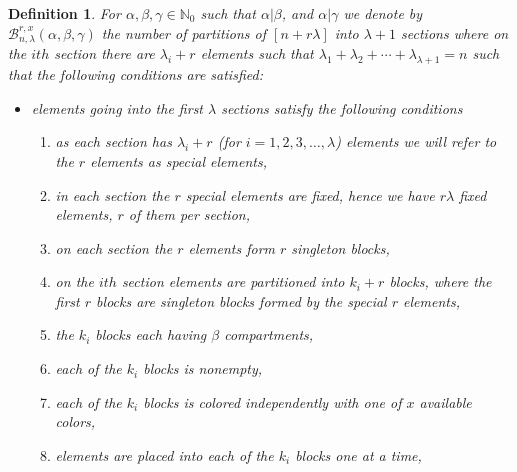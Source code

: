 \documentclass[12pt]{amsart}
\newtheorem{proof 1}{proof 1}
\newtheorem{definition}{Definition}[section]
\begin{document}
\begin{definition}\label{definition:270}For $\alpha,\beta,\gamma\in\mathbb{N}_0$ such that $\alpha|\beta$, and $\alpha|\gamma$ we denote by $\mathcal{B}^{r,x}_{n,\lambda}(\alpha,\beta,\gamma)$	the number of partitions of $[n+r\lambda]$ into $\lambda+1$ sections where on the $ith$ section there are $\lambda_i+r$ elements such that $\lambda_1+\lambda_2+\cdots+\lambda_{\lambda+1}=n$  such that the following conditions are satisfied:
	
\begin{itemize}\item 	elements going into the first $\lambda$ sections satisfy the following conditions
	\begin{enumerate}
		\item as each section has $\lambda_i+r$ (for $i=1,2,3,\ldots,\lambda$) elements we will refer to the $r$ elements as special elements, 
		\item in each section the $r$ special elements are fixed, hence we have $r\lambda$ fixed elements, $r$ of them per section,
		\item on each section the $r$ elements form $r$ singleton blocks,
		\item on the $ith$ section elements are partitioned into $k_i+r$ blocks, where the first $r$ blocks are singleton blocks formed by the special $r$ elements,
		\item the $k_i$ blocks each having $\beta$ compartments,
		\item each of the $k_i$ blocks is nonempty,
		\item each of the $k_i$ blocks is colored independently with one of $x$ available colors, 
		\item elements are placed into each of the $k_i$ blocks one at a time,
		

\end{enumerate}
\end{itemize}
\end{definition}
\end{document}
